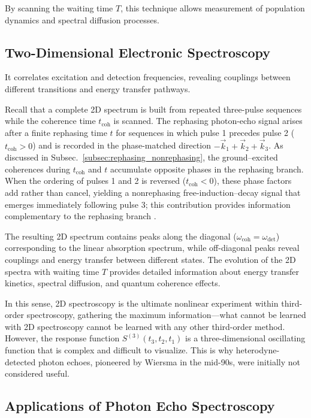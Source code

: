 \noindent 
By scanning the waiting time $T$, this technique allows measurement of population dynamics and spectral diffusion processes.

\subsection{Two-Dimensional Electronic Spectroscopy}
\label{subsec:2d_spectroscopy}

\noindent 
It correlates excitation and detection frequencies, revealing couplings between different transitions and energy transfer pathways.

\noindent 
Recall that a complete 2D spectrum is built from repeated three-pulse sequences while the coherence time $t_{\text{coh}}$ is scanned. The rephasing photon-echo signal arises after a finite rephasing time $t$ for sequences in which pulse 1 precedes pulse 2 ($t_{\text{coh}}>0$) and is recorded in the phase-matched direction $-\vec{k}_1 + \vec{k}_2 + \vec{k}_3$. As discussed in Subsec.~\ref{subsec:rephasing_nonrephasing}, the ground–excited coherences during $t_{\text{coh}}$ and $t$ accumulate opposite phases in the rephasing branch. When the ordering of pulses 1 and 2 is reversed ($t_{\text{coh}}<0$), these phase factors add rather than cancel, yielding a nonrephasing free-induction–decay signal that emerges immediately following pulse 3; this contribution provides information complementary to the rephasing branch \cite{ginsbergetal2009twodimensionalelectronicspectroscopy}.

\noindent The resulting 2D spectrum contains peaks along the diagonal ($\omega_{\text{coh}} = \omega_{\text{det}}$) corresponding to the linear absorption spectrum, while off-diagonal peaks reveal couplings and energy transfer between different states. The evolution of the 2D spectra with waiting time $T$ provides detailed information about energy transfer kinetics, spectral diffusion, and quantum coherence effects.

\noindent In this sense, 2D spectroscopy is the ultimate nonlinear experiment within third-order spectroscopy, gathering the maximum information—what cannot be learned with 2D spectroscopy cannot be learned with any other third-order method. However, the response function $S^{(3)}(t_3, t_2, t_1)$ is a three-dimensional oscillating function that is complex and difficult to visualize. This is why heterodyne-detected photon echoes, pioneered by Wiersma in the mid-90s, were initially not considered useful.

\subsection{Applications of Photon Echo Spectroscopy}
\label{subsec:echo_applications}

